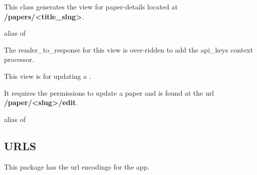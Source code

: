 \documentclass[letterpaper,10pt,english]{sphinxmanual}
\begin{document}
\begin{fulllineitems}
\label{papers:papers.views.PaperDetailView}
This class generates the view for paper-details located at \textbf{/papers/\textless{}title\_slug\textgreater{}}.

\begin{fulllineitems}
\label{papers:papers.views.PaperDetailView.model}
alias of 

\end{fulllineitems}


\begin{fulllineitems}
\label{papers:papers.views.PaperDetailView.render_to_response}
The render\_to\_response for this view is over-ridden to add the api\_keys context processor.

\end{fulllineitems}


\end{fulllineitems}


\begin{fulllineitems}
\label{papers:papers.views.PaperUpdate}
This view is for updating a {\hyperref[papers:papers.models.Publication]{}}.

It requires the permissions to update a paper and is found at the url \textbf{/paper/\textless{}slug\textgreater{}/edit}.

\begin{fulllineitems}
\label{papers:papers.views.PaperUpdate.model}
alias of 

\end{fulllineitems}


\end{fulllineitems}



\subsection{URLS}
\label{papers:module-papers.urls}\label{papers:urls}
This package has the url encodings for the {\hyperref[papers:module-papers]{}} app.
\end{document}
